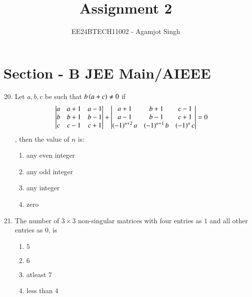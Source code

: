 \documentclass[journal,onecolumn]{IEEEtran}
\theoremstyle{remark}
\begin{document}

\vspace{3cm}

\title{Assignment 2}
\author{EE24BTECH11002 - Agamjot Singh}
\maketitle

\newcommand{\adj}[1]{$adj\brak{#1}$}
\renewcommand{\thefigure}{\theenumi}
\renewcommand{\thetable}{\theenumi}
\section*{Section - B JEE Main/AIEEE}
\begin{enumerate}
    \setcounter{enumi}{19}

    \item Let $a,b,c$ be such that $b\left(a+c\right)\neq0$ if
	\begin{align*}
		\begin{vmatrix}
			a & a+1 & a-1\\
			b & b+1 & b-1\\
			c & c-1 & c+1\\
		\end{vmatrix}
		+
		\begin{vmatrix}
			a+1 & b+1 & c-1\\
			a-1 & b-1 & c+1\\
			\left(-1\right)^{n+2}a & \left(-1\right)^{n+1}b & \left(-1\right)^{n}c\\
		\end{vmatrix}	
		= 0
	\end{align*},
		then the value of $n$ is:
	\hfill{}
	\begin{enumerate}
                \item any even integer
		\item any odd integer 
		\item any integer 
		\item zero 
	\end{enumerate}

    \item The number of $3\times3$ non-singular matrices with four entries as $1$ and all other entries as $0$, is 
	\hfill{}{\par}


	\begin{enumerate}
                \item $5$ 
		\item $6$
		\item atleast $7$
		\item less than $4$ 
	\end{enumerate}


\end{enumerate}
\end{document}
